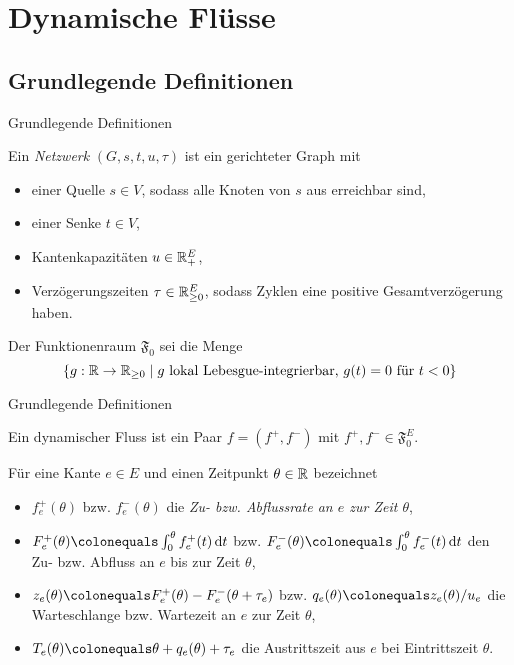 \section{Dynamische Flüsse}
\subsection{Grundlegende Definitionen}

\begin{frame}{Grundlegende Definitionen}
	\begin{definition}[Netzwerk]
		Ein \emph{Netzwerk} $(G, s, t, u, \tau)$ ist ein gerichteter Graph mit
		\begin{itemize}[label=\color{darkblue}$\bullet$]
			\item einer Quelle $s\in V$, sodass alle Knoten von $s$ aus erreichbar sind,
			\item einer Senke $t\in V$,
			\item Kantenkapazitäten $u\in\mathbb{R}_+^E$,
			\item Verzögerungszeiten $\tau\in\mathbb{R}_{\geq 0}^E$, sodass Zyklen eine positive Gesamtverzögerung haben.
		\end{itemize}
	\end{definition}
	\pause
	\begin{definition}
		Der Funktionenraum $\mathfrak{F}_0$ sei die Menge
		\[ \{ g: \mathbb{R}\to\mathbb{R}_{\geq 0} \mid \text{$g$ lokal Lebesgue-integrierbar, $g(t) = 0$ für $t<0$} \} \]
	\end{definition}
\end{frame}


\begin{frame}{Grundlegende Definitionen}
	\begin{definition}
		Ein dynamischer Fluss ist ein Paar $f=(f^+, f^-)$ mit $f^+, f^-\in\mathfrak{F}_0^E$.
		
		Für eine Kante $e\in E$ und einen Zeitpunkt $\theta\in\mathbb{R}$ bezeichnet
		\begin{itemize}[label=$\color{darkblue}\bullet$]
			\pause\item $f_e^+(\theta)$ bzw. $f_e^-(\theta)$ die \emph{Zu- bzw. Abflussrate an $e$ zur Zeit $\theta$},
			\pause\item $F_e^+(\theta) \colonequals \int_0^\theta f^+_e(t) \diff t$ bzw. $F^-_e(\theta)\colonequals\int_0^\theta f^-_e(t)\diff t$ den Zu- bzw. Abfluss an $e$ bis zur Zeit $\theta$,
			\pause\item $z_e(\theta)\colonequals F_e^+(\theta) - F_e^-(\theta + \tau_e)$ bzw. $q_e(\theta)\colonequals z_e(\theta)/u_e$ die Warteschlange bzw. Wartezeit an $e$ zur Zeit $\theta$,
			\pause\item $T_e(\theta)\colonequals\theta + q_e(\theta) + \tau_e$ die Austrittszeit aus $e$ bei Eintrittszeit $\theta$.
		\end{itemize}	
	\end{definition}
\end{frame}


